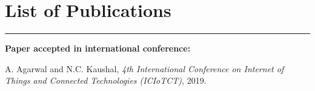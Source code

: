 \chapter*{List of Publications} \label{publications} %
\noindent\rule{\linewidth}{2pt}

\noindent \textbf{{\large Paper accepted in international conference:}}
\begin{enumerate}[label=\textbf{[\arabic*]}]
	\item A. Agarwal and N.C. Kaushal,  \textit{4th International Conference on Internet of Things and Connected Technologies (ICIoTCT)}, 2019.
\end{enumerate} 